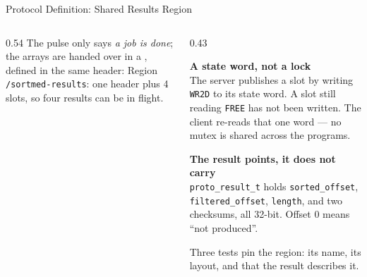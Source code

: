 \begin{frame}{Protocol Definition: Shared Results Region}
  \begin{columns}[t, onlytextwidth]
    \begin{column}{0.54\textwidth}
      The pulse only says \emph{a job is done}; the arrays are handed over in a
      , defined in the same header:
      \vskip1mm
      \vskip1.5mm
      {\footnotesize Region \texttt{/sortmed-results}: one header plus
       \num{4} slots, so four results can be in flight.}
    \end{column}
    \begin{column}{0.43\textwidth}
      \begin{tech}
        \textbf{A state word, not a lock} \\
        The server publishes a slot by writing \texttt{WR2D} to its state word.
        A slot still reading \texttt{FREE} has not been written. The client
        re-reads that one word — no mutex is shared across the programs.
      \end{tech}
      \vskip1.5mm
      \begin{highlight}
        \textbf{The result points, it does not carry} \\
        \texttt{proto\_result\_t} holds \texttt{sorted\_offset},
        \texttt{filtered\_offset}, \texttt{length}, and two checksums, all
        32-bit. Offset 0 means ``not produced''.
      \end{highlight}
      \vskip1mm
      {\footnotesize Three tests pin the region: its name, its layout, and
       that the result describes it.}
    \end{column}
  \end{columns}
\end{frame}

